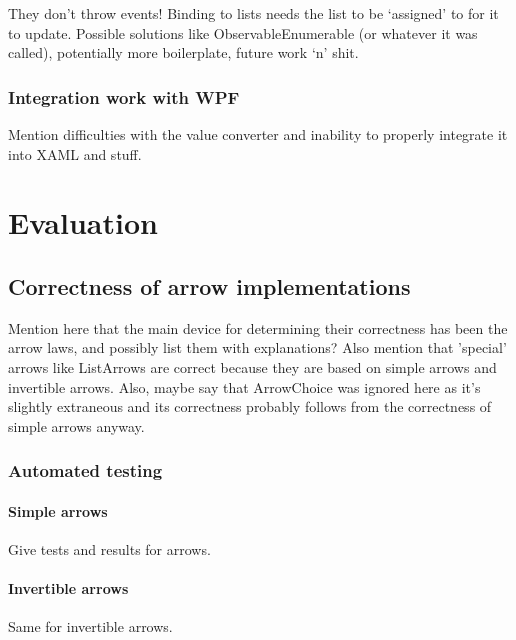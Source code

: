 \documentclass[12pt,twoside,notitlepage]{report}
\begin{document}
They don't throw events! Binding to lists needs the list to be ‘assigned’ to for it to update. Possible solutions like ObservableEnumerable (or whatever it was called), potentially more boilerplate, future work ‘n’ shit.

\subsection{Integration work with WPF}

Mention difficulties with the value converter and inability to properly integrate it into XAML and stuff.

\cleardoublepage



\chapter{Evaluation}

\section{Correctness of arrow implementations}

Mention here that the main device for determining their correctness has been the arrow laws, and possibly list them with explanations? Also mention that 'special' arrows like ListArrows are correct because they are based on simple arrows and invertible arrows. Also, maybe say that ArrowChoice was ignored here as it's slightly extraneous and its correctness probably follows from the correctness of simple arrows anyway.

\subsection{Automated testing}

\subsubsection{Simple arrows}

Give tests and results for arrows.

\subsubsection{Invertible arrows}

Same for invertible arrows.
\end{document}
